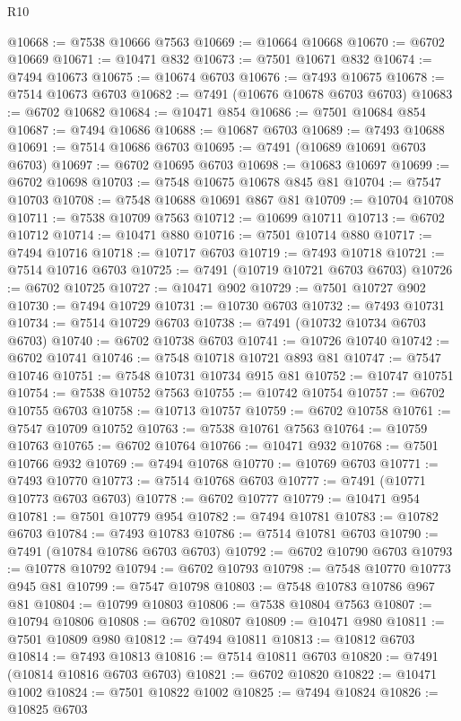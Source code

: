 \begin{lexlean}{R10}
\begin{coremodule}
@10668 := @7538 @10666 @7563
@10669 := @10664 @10668
@10670 := @6702 @10669
@10671 := @10471 @832
@10673 := @7501 @10671 @832
@10674 := @7494 @10673
@10675 := @10674 @6703
@10676 := @7493 @10675
@10678 := @7514 @10673 @6703
@10682 := @7491 (@10676 @10678 @6703 @6703)
@10683 := @6702 @10682
@10684 := @10471 @854
@10686 := @7501 @10684 @854
@10687 := @7494 @10686
@10688 := @10687 @6703
@10689 := @7493 @10688
@10691 := @7514 @10686 @6703
@10695 := @7491 (@10689 @10691 @6703 @6703)
@10697 := @6702 @10695 @6703
@10698 := @10683 @10697
@10699 := @6702 @10698
@10703 := @7548 @10675 @10678 @845 @81
@10704 := @7547 @10703
@10708 := @7548 @10688 @10691 @867 @81
@10709 := @10704 @10708
@10711 := @7538 @10709 @7563
@10712 := @10699 @10711
@10713 := @6702 @10712
@10714 := @10471 @880
@10716 := @7501 @10714 @880
@10717 := @7494 @10716
@10718 := @10717 @6703
@10719 := @7493 @10718
@10721 := @7514 @10716 @6703
@10725 := @7491 (@10719 @10721 @6703 @6703)
@10726 := @6702 @10725
@10727 := @10471 @902
@10729 := @7501 @10727 @902
@10730 := @7494 @10729
@10731 := @10730 @6703
@10732 := @7493 @10731
@10734 := @7514 @10729 @6703
@10738 := @7491 (@10732 @10734 @6703 @6703)
@10740 := @6702 @10738 @6703
@10741 := @10726 @10740
@10742 := @6702 @10741
@10746 := @7548 @10718 @10721 @893 @81
@10747 := @7547 @10746
@10751 := @7548 @10731 @10734 @915 @81
@10752 := @10747 @10751
@10754 := @7538 @10752 @7563
@10755 := @10742 @10754
@10757 := @6702 @10755 @6703
@10758 := @10713 @10757
@10759 := @6702 @10758
@10761 := @7547 @10709 @10752
@10763 := @7538 @10761 @7563
@10764 := @10759 @10763
@10765 := @6702 @10764
@10766 := @10471 @932
@10768 := @7501 @10766 @932
@10769 := @7494 @10768
@10770 := @10769 @6703
@10771 := @7493 @10770
@10773 := @7514 @10768 @6703
@10777 := @7491 (@10771 @10773 @6703 @6703)
@10778 := @6702 @10777
@10779 := @10471 @954
@10781 := @7501 @10779 @954
@10782 := @7494 @10781
@10783 := @10782 @6703
@10784 := @7493 @10783
@10786 := @7514 @10781 @6703
@10790 := @7491 (@10784 @10786 @6703 @6703)
@10792 := @6702 @10790 @6703
@10793 := @10778 @10792
@10794 := @6702 @10793
@10798 := @7548 @10770 @10773 @945 @81
@10799 := @7547 @10798
@10803 := @7548 @10783 @10786 @967 @81
@10804 := @10799 @10803
@10806 := @7538 @10804 @7563
@10807 := @10794 @10806
@10808 := @6702 @10807
@10809 := @10471 @980
@10811 := @7501 @10809 @980
@10812 := @7494 @10811
@10813 := @10812 @6703
@10814 := @7493 @10813
@10816 := @7514 @10811 @6703
@10820 := @7491 (@10814 @10816 @6703 @6703)
@10821 := @6702 @10820
@10822 := @10471 @1002
@10824 := @7501 @10822 @1002
@10825 := @7494 @10824
@10826 := @10825 @6703

\end{coremodule}
\end{lexlean}

